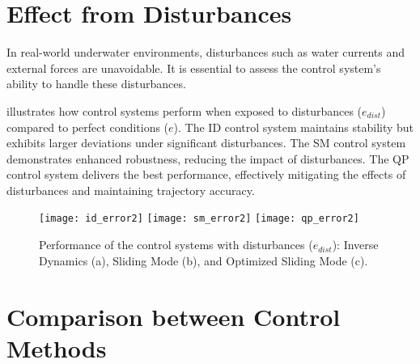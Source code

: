 \section{Effect from Disturbances}

    In real-world underwater environments, disturbances such as water currents and external forces are unavoidable. It is essential to assess the control system's ability to handle these disturbances.
    
     illustrates how control systems perform when exposed to disturbances ($e_{dist}$) compared to perfect conditions ($e$). The ID control system maintains stability but exhibits larger deviations under significant disturbances. The SM control system demonstrates enhanced robustness, reducing the impact of disturbances. The QP control system delivers the best performance, effectively mitigating the effects of disturbances and maintaining trajectory accuracy.

    \begin{figure}[h]
        \centering
        \texttt{[image: id\_error2]}
        \texttt{[image: sm\_error2]}
        \texttt{[image: qp\_error2]}
        \caption{Performance of the control systems with disturbances ($e_{dist}$): Inverse Dynamics (a), Sliding Mode (b), and Optimized Sliding Mode (c).}
        \label{image:disturbances}
    \end{figure}

\section{Comparison between Control Methods}

